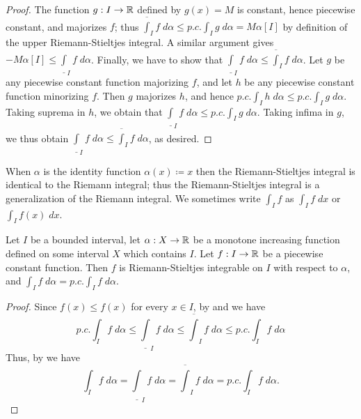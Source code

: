 \begin{proof}
  The function \(g : I \to \mathbb{R}\) defined by \(g(x) = M\) is constant, hence piecewise constant, and majorizes \(f\);
  thus \(\overline{\int}_I f \; d \alpha \leq p.c. \int_I g \; d \alpha = M \alpha[I]\) by definition of the upper Riemann-Stieltjes integral.
  A similar argument gives \(-M \alpha[I] \leq \underline{\int}_I f \; d \alpha\).
  Finally, we have to show that \(\underline{\int}_I f \; d \alpha \leq \overline{\int}_I f \; d \alpha\).
  Let \(g\) be any piecewise constant function majorizing \(f\), and let \(h\) be any piecewise constant function minorizing \(f\).
  Then \(g\) majorizes \(h\), and hence \(p.c. \int_I h \; d \alpha \leq p.c. \int_I g \; d \alpha\).
  Taking suprema in \(h\), we obtain that \(\underline{\int}_I f \; d \alpha \leq p.c. \int_I g \; d \alpha\).
  Taking infima in \(g\), we thus obtain \(\underline{\int}_I f \; d \alpha \leq \overline{\int}_I f \; d \alpha\), as desired.
\end{proof}

\begin{note}
  When \(\alpha\) is the identity function \(\alpha(x) \coloneqq x\) then the Riemann-Stieltjes integral is identical to the Riemann integral;
  thus the Riemann-Stieltjes integral is a generalization of the Riemann integral.
  We sometimes write \(\int_I f\) as \(\int_I f \; dx\) or \(\int_I f(x) \; dx\).
\end{note}

\begin{ac}\label{i:ac:11.8.10}
  Let \(I\) be a bounded interval, let \(\alpha : X \to \mathbb{R}\) be a monotone increasing function defined on some interval \(X\) which contains \(I\).
  Let \(f : I \to \mathbb{R}\) be a piecewise constant function.
  Then \(f\) is Riemann-Stieltjes integrable on \(I\) with respect to \(\alpha\), and \(\int_I f \; d \alpha = p.c. \int_I f \; d \alpha\).
\end{ac}

\begin{proof}
  Since \(f(x) \leq f(x)\) for every \(x \in I\), by  and  we have
  \[
    p.c. \int_I f \; d \alpha \leq \underline{\int}_I f \; d \alpha \leq \overline{\int}_I f \; d \alpha \leq p.c. \int_I f \; d \alpha
  \]
  Thus, by  we have
  \[
    \int_I f \; d \alpha = \underline{\int}_I f \; d \alpha = \overline{\int}_I f \; d \alpha = p.c. \int_I f \; d \alpha.
  \]
\end{proof}

